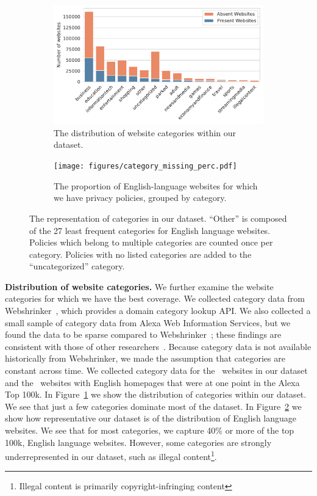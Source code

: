 \begin{figure}[t]
\begin{subfigure}[t]{0.45\textwidth}
\centering
\includegraphics[width=1\columnwidth]{figures/category_dist.pdf}
\caption{The distribution of website categories within our dataset.}
\label{fig:cat_dist}
\end{subfigure}
\hfill
\begin{subfigure}[t]{0.45\textwidth}
\centering
\texttt{[image: figures/category\_missing\_perc.pdf]}
\caption{The proportion of English-language websites for which we have privacy policies, grouped by category.}
\label{fig:cat_prop}
\end{subfigure}

\caption{The representation of categories in our dataset. ``Other'' is composed of the 27 least frequent categories for English language websites. Policies which belong to multiple categories are counted once per category. Policies with no listed categories are added to the ``uncategorized'' category.}
\label{fig:categories}
\end{figure}

{\textbf{Distribution of website categories.}}
We further examine the website categories for which we have the best coverage. We collected category data from Webshrinker~\cite{Webshrinker}, which provides a domain category lookup API.
We also collected a small sample of category data from Alexa Web Information Services, but we found the data to be sparse compared to Webshrinker~\cite{awis}; these findings are consistent with those of other researchers~\cite{mathur2019dark}.
Because category data is not available historically from Webshrinker, we made the assumption that categories are constant across time. We collected category data for the \numpresentdoms~websites in our dataset and the \numabsentenglishdoms~websites with English homepages that were at one point in the Alexa Top 100k.
In Figure~\ref{fig:cat_dist} we show the distribution of categories within our dataset. We see that just a few categories dominate most of the dataset.
In Figure~\ref{fig:cat_prop} we show how representative our dataset is of the distribution of English language websites.
We see that for most categories, we capture 40\% or more of the top 100k, English language websites.
However, some categories are strongly
underrepresented in our dataset, such as illegal content\footnote{Illegal content is primarily copyright-infringing content}.